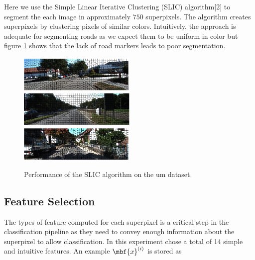 \documentclass{article} %
\begin{document}
Here we use the Simple Linear Iterative Clustering (SLIC) algorithm[2] to segment the each image in approximately $750$ superpixels. The algorithm creates superpixels by clustering pixels of similar colors. Intuitively, the approach is adequate for segmenting roads as we expect them to be uniform in color but figure \ref{fig:SLIC} shows that the lack of road markers leads to poor segmentation.

\begin{figure}[ht!]
\centering
 \includegraphics[width=0.5\textwidth]{figs/SLICOuu.pdf}\\
 \vspace{-2pt}
 \includegraphics[width=0.5\textwidth]{figs/SLICOum.pdf}\\
 \vspace{-2pt}
 \includegraphics[width=0.5\textwidth]{figs/SLICOumm.pdf}\\
 \caption{Performance of the SLIC algorithm on the um dataset.}\label{fig:SLIC}
\end{figure}

\subsection{Feature Selection}\label{sec:feat}

The types of feature computed for each superpixel is a critical step in the classification pipeline as they need to convey enough information about the superpixel to allow classification. In this experiment chose a total of 14 simple and intuitive features. An example $\mbf{x}^{(i)}$ is stored as
\end{document}
